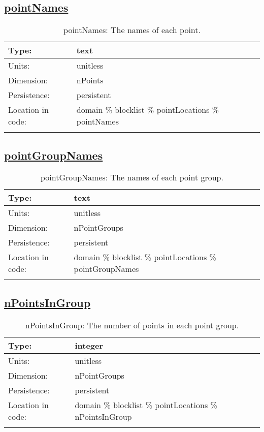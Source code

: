\subsection[pointNames]{\hyperref[sec:var_tab_pointLocations]{pointNames}}
\label{subsec:var_sec_pointLocations_pointNames}
\begin{center}
\begin{longtable}{| p{2.0in} | p{4.0in} |}
        \hline 
        Type: & text \\
        \hline 
        Units: & \si{unitless} \\
        \hline 
        Dimension: & nPoints \\
        \hline 
        Persistence: & persistent \\
        \hline 
         Location in code: & domain \% blocklist \% pointLocations \% pointNames \\
         \hline 
    \caption{pointNames: The names of each point.}
\end{longtable}
\end{center}
\subsection[pointGroupNames]{\hyperref[sec:var_tab_pointLocations]{pointGroupNames}}
\label{subsec:var_sec_pointLocations_pointGroupNames}
\begin{center}
\begin{longtable}{| p{2.0in} | p{4.0in} |}
        \hline 
        Type: & text \\
        \hline 
        Units: & \si{unitless} \\
        \hline 
        Dimension: & nPointGroups \\
        \hline 
        Persistence: & persistent \\
        \hline 
         Location in code: & domain \% blocklist \% pointLocations \% pointGroupNames \\
         \hline 
    \caption{pointGroupNames: The names of each point group.}
\end{longtable}
\end{center}
\subsection[nPointsInGroup]{\hyperref[sec:var_tab_pointLocations]{nPointsInGroup}}
\label{subsec:var_sec_pointLocations_nPointsInGroup}
\begin{center}
\begin{longtable}{| p{2.0in} | p{4.0in} |}
        \hline 
        Type: & integer \\
        \hline 
        Units: & \si{unitless} \\
        \hline 
        Dimension: & nPointGroups \\
        \hline 
        Persistence: & persistent \\
        \hline 
         Location in code: & domain \% blocklist \% pointLocations \% nPointsInGroup \\
         \hline 
    \caption{nPointsInGroup: The number of points in each point group.}
\end{longtable}
\end{center}
